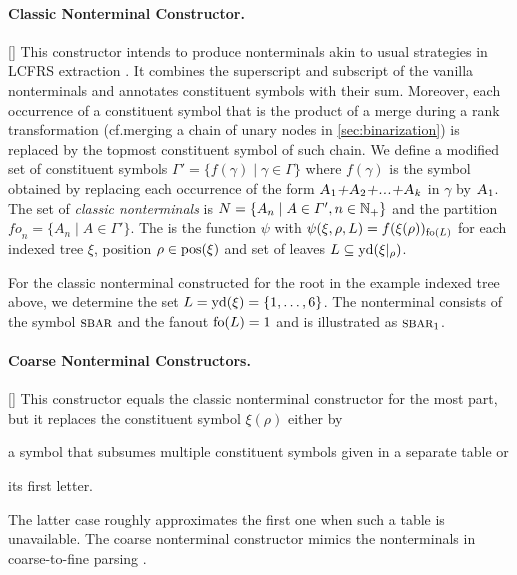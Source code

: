 \documentclass[../../document.tex]{subfiles}
\begin{document}
    \paragraph{Classic Nonterminal Constructor.}[]
    This constructor intends to produce nonterminals akin to usual strategies in LCFRS extraction \citep{MaierSogaard08}.
    It combines the superscript and subscript of the vanilla nonterminals and annotates constituent symbols with their sum.
    Moreover, each occurrence of a constituent symbol that is the product of a merge during a rank transformation (cf.\@ merging a chain of unary nodes in \cref{sec:binarization}) is replaced by the topmost constituent symbol of such chain.
    We define a modified set of constituent symbols \(\varGamma' = \{ f(\gamma) \mid \gamma \in \varGamma \}\) where \(f(\gamma)\) is the symbol obtained by replacing each occurrence of the form \(\textsc{\textsl{A$_1$+A$_2$+...+A$_k$}}\) in \(\gamma\) by \(\textsc{\textsl{A$_1$}}\).
    The set of \emph{classic nonterminals} is \(N = \{ A_n \mid A \in \varGamma', n \in \mathbb{N}_+ \}\) and the partition \(\mathit{fo}_n = \{A_n \mid A \in \varGamma'\}\).
    The  is the function \(\psi\) with \(\psi(\xi, \rho, L) = f(\xi(\rho))_{\operatorname{fo}(L)}\) for each indexed tree \(\xi\), position \(\rho \in \operatorname{pos}(\xi)\) and set of leaves \(L \subseteq \operatorname{yd}(\xi|_\rho)\).

    \begin{example}
    For the classic nonterminal constructed for the root in the example indexed tree above, we determine the set \(L = \operatorname{yd}(\xi) = \{1,\ldots,6\}\).
    The nonterminal consists of the symbol \(\textsc{sbar}\) and the fanout \(\operatorname{fo}(L) = 1\) and is illustrated as \(\textsc{sbar}_1\).
    \end{example}

    \paragraph{Coarse Nonterminal Constructors.}[]
    This constructor equals the classic nonterminal constructor for the most part, but it replaces the constituent symbol \(\xi(\rho)\) either by
    \begin{inparaenum}
        \item a symbol that subsumes multiple constituent symbols given in a separate table or
        \item its first letter.
    \end{inparaenum}
    The latter case roughly approximates the first one when such a table is unavailable.
    The coarse nonterminal constructor mimics the nonterminals in coarse-to-fine parsing \citep{Cha06,Tei17}.
\end{document}
